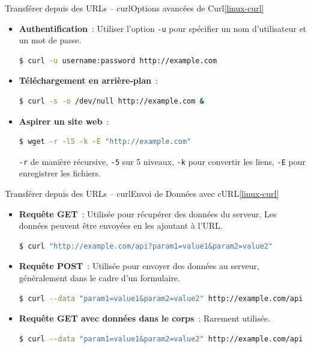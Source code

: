 \documentclass{beamer}
\begin{document}
    \begin{frame}[fragile]{Transférer depuis des URLs – curl}{Options avancées de Curl\cref{linux-curl}}
        \begin{itemize}
            \item \textbf{Authentification}~: Utiliser l'option \lstinline{-u} pour spécifier un nom d'utilisateur et un mot de passe.
            \begin{lstlisting}[language=bash]
$ curl -u username:password http://example.com
            \end{lstlisting}
            \item \textbf{Téléchargement en arrière-plan}~:
            \begin{lstlisting}[language=bash]
$ curl -s -o /dev/null http://example.com &
            \end{lstlisting}
            \item \textbf{Aspirer un site web}~:
            \begin{lstlisting}[language=bash]
$ wget -r -l5 -k -E "http://example.com"
            \end{lstlisting}
            \lstinline{-r} de manière récursive, \lstinline{-5} sur 5 niveaux, \lstinline{-k} pour convertir les liens, \lstinline{-E} pour enregistrer les fichiers.
        \end{itemize}
    \end{frame}

    \begin{frame}[fragile]{Transférer depuis des URLs – curl}{Envoi de Données avec cURL\cref{linux-curl}}
        \begin{itemize}
            \item \textbf{Requête GET}~: Utilisée pour récupérer des données du serveur. Les données peuvent être envoyées en les ajoutant à l'URL.
            \begin{lstlisting}[language=bash]
$ curl "http://example.com/api?param1=value1&param2=value2"
            \end{lstlisting}
            \item \textbf{Requête POST}~: Utilisée pour envoyer des données au serveur, généralement dans le cadre d'un formulaire.
            \begin{lstlisting}[language=bash]
$ curl --data "param1=value1&param2=value2" http://example.com/api
            \end{lstlisting}
            \item \textbf{Requête GET avec données dans le corps}~: Rarement utilisée.
            \begin{lstlisting}[language=bash]
$ curl --data "param1=value1&param2=value2" http://example.com/api --get
            \end{lstlisting}
        \end{itemize}
    \end{frame}
\end{document}
